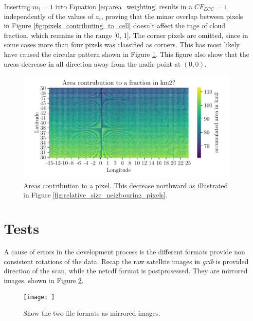 Inserting $m_i = 1$ into Equation \eqref{eq:area_weighting} results in a $CF_{ECC}=1$, independently of the values of $a_i$, proving that the minor overlap between pixels in Figure \ref{fig:pixels_contributing_to_cell} doesn't affect the rage of cloud fraction, which remains in the range [0, 1]. The corner pixels are omitted, since in some cases more than four pixels was classified as corners. This has most likely have caused the circular pattern shown in Figure \ref{fig:area_pixel_signal}. This figure also show that the areas decrease in all direction away from the nadir point at $(0,0)$.
\begin{figure}[ht]
    \centering
    \includegraphics{python_figs/signal_area_pixel.pdf}
    \caption{Areas contribution to a pixel. This decrease northward as illustrated in Figure \ref{fig:relative_size_neigbouring_pixels}.}
    \label{fig:area_pixel_signal}
\end{figure} 

\section{Tests}
A cause of errors in the development process is the different formats provide non consistent rotations of the data. Recap the raw satellite images in \textit{grib} is provided  direction of the scan, while the netcdf format is postprosessed. They are mirrored images, shown in Figure \ref{fig:netcdf_vs_grib}. 

\begin{figure}
    \centering
    \texttt{[image: ]}
    \caption{Show the two file formats as mirrored images.}
    \label{fig:netcdf_vs_grib}
\end{figure}

